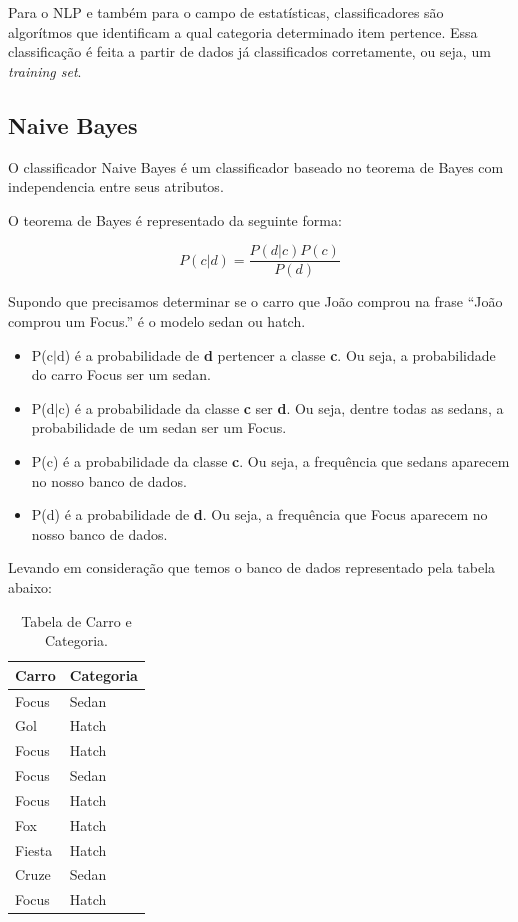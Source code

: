 Para o \ac{NLP} e também para o campo de estatísticas, classificadores são
algorítmos que identificam a qual categoria determinado item pertence. Essa
classificação é feita a partir de dados já classificados corretamente, ou seja,
um \textit{training set}.

\subsection{Naive Bayes}

O classificador Naive Bayes é um classificador baseado no teorema de Bayes com
independencia entre seus atributos.

O teorema de Bayes é representado da seguinte forma:

\[ P(c|d) = \frac{P(d|c) P(c)}{P(d)}  \]

Supondo que precisamos determinar se o carro que João comprou na frase ``João
comprou um Focus.'' é o modelo sedan ou hatch.
 
\begin{itemize}
  \item P(c$\vert$d) é a probabilidade de \textbf{d} pertencer a classe
  \textbf{c}. Ou seja, a probabilidade do carro Focus ser um sedan.
  \item P(d$\vert$c) é a probabilidade da classe \textbf{c} ser \textbf{d}. Ou
  seja, dentre todas as sedans, a probabilidade de um sedan ser
  um Focus.
  \item P(c) é a probabilidade da classe \textbf{c}. Ou seja, a frequência que
  sedans aparecem no nosso banco de dados.
  \item P(d) é a probabilidade de \textbf{d}. Ou seja, a frequência que Focus aparecem no nosso banco de dados.
\end{itemize}

Levando em consideração que temos o banco de dados representado pela tabela
abaixo:

\begin{table}[htb]
\centering
\label{123}
\begin{tabular}{|l|l|}
\hline
Carro  & Categoria \\ \hline
Focus  & Sedan     \\ \hline
Gol    & Hatch     \\ \hline
Focus  & Hatch     \\ \hline
Focus  & Sedan     \\ \hline
Focus  & Hatch     \\ \hline
Fox    & Hatch     \\ \hline
Fiesta & Hatch     \\ \hline
Cruze  & Sedan     \\ \hline
Focus  & Hatch     \\ \hline
\end{tabular} 
\caption{Tabela de Carro e Categoria.}
\end{table}

